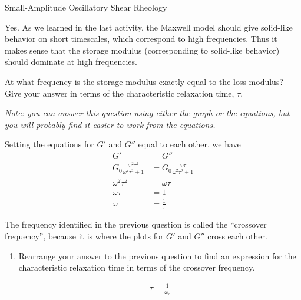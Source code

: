 \begin{activity}[extension]{Small-Amplitude Oscillatory Shear Rheology}
\begin{ctqs}
\begin{enumerate}
				\begin{solution}[2in]
				
					Yes. As we learned in the last activity, the Maxwell model should give solid-like behavior on short timescales, which correspond to high frequencies.  Thus it makes sense that the storage modulus (corresponding to solid-like behavior) should dominate at high frequencies.
				
				\end{solution}
	\end{enumerate}

	\question At what frequency is the storage modulus exactly equal to the loss modulus?  Give your answer in terms of the characteristic relaxation time, $\tau$.
	
		\emph{Note: you can answer this question using either the graph or the equations, but you will probably find it easier to work from the equations.}
	
					\begin{solution}[1.75in]
					
						Setting the equations for $G'$ and $G''$ equal to each other, we have
						\begin{align*}
							G' &= G''\\
							G_0 \frac{\omega^2 \tau^2}{\omega^2 \tau^2 + 1} &= G_0 \frac{\omega \tau}{\omega^2 \tau^2 + 1}\\
							\omega^2 \tau^2 &= \omega \tau\\
							\omega\tau &= 1\\
							\omega &= \frac{1}{\tau}
						\end{align*}
					\end{solution}
	
	\question The frequency identified in the previous question is called the ``crossover frequency'', because it is where the plots for $G'$ and $G''$ cross each other.
	
		\begin{enumerate}
			\item Rearrange your answer to the previous question to find an expression for the characteristic relaxation time in terms of the crossover frequency.
	
					\begin{solution}[1in]
					
						\begin{align*}
							\tau = \frac{1}{\omega_c}
						\end{align*}
					\end{solution}
					

\end{enumerate}
\end{ctqs}
\end{activity}
